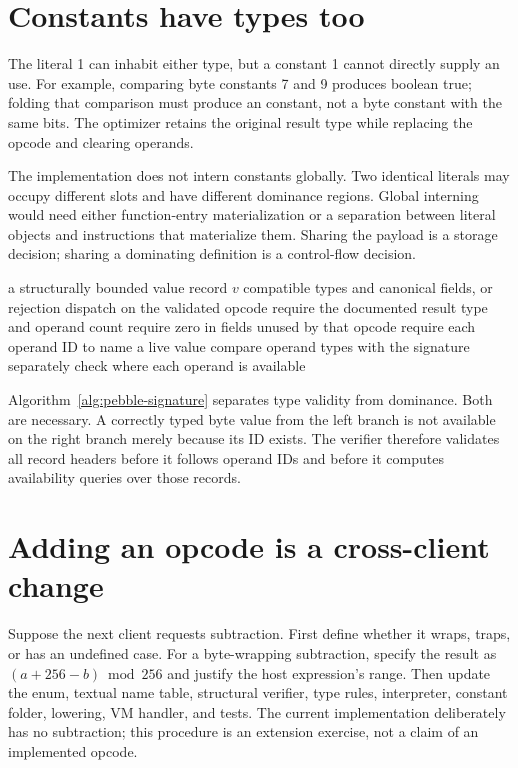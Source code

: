 \section{Constants have types too}
\label{sec:pebble-constants}
The literal 1 can inhabit either type, but a  constant 1 cannot directly supply an  use.
For example, comparing byte constants 7 and 9 produces boolean true; folding that comparison must produce an  constant, not a byte constant with the same bits.
The optimizer retains the original result type while replacing the opcode and clearing operands.

The implementation does not intern constants globally.
Two identical literals may occupy different slots and have different dominance regions.
Global interning would need either function-entry materialization or a separation between literal objects and instructions that materialize them.
Sharing the payload is a storage decision; sharing a dominating definition is a control-flow decision.

\begin{algorithm}[htbp]
\caption{Checking an operation against its semantic signature.}
\label{alg:pebble-signature}
\begin{pseudocode}
\Require a structurally bounded value record $v$
\Ensure compatible types and canonical fields, or rejection
\State dispatch on the validated opcode
\State require the documented result type and operand count
\State require zero in fields unused by that opcode
\State require each operand ID to name a live value
\State compare operand types with the signature
\State separately check where each operand is available
\end{pseudocode}
\end{algorithm}

Algorithm~\ref{alg:pebble-signature} separates type validity from dominance.
Both are necessary.
A correctly typed byte value from the left branch is not available on the right branch merely because its ID exists.
The verifier therefore validates all record headers before it follows operand IDs and before it computes availability queries over those records.

\section{Adding an opcode is a cross-client change}
\label{sec:pebble-op-extension}
Suppose the next client requests subtraction.
First define whether it wraps, traps, or has an undefined case.
For a byte-wrapping subtraction, specify the result as $(a+256-b)\bmod256$ and justify the host expression's range.
Then update the enum, textual name table, structural verifier, type rules, interpreter, constant folder, lowering, VM handler, and tests.
The current implementation deliberately has no subtraction; this procedure is an extension exercise, not a claim of an implemented opcode.

